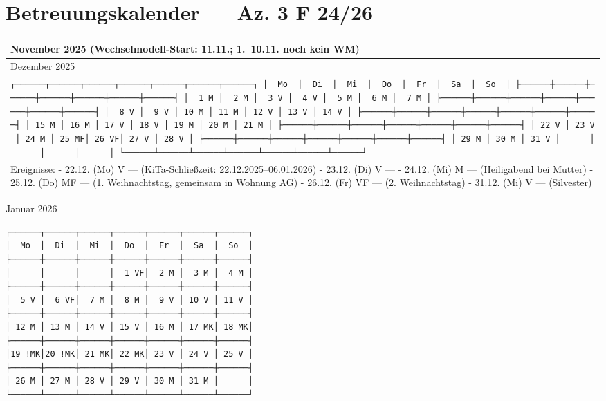 \section{Betreuungskalender --- Az. 3 F
24/26}\label{betreuungskalender-az.-3-f-2426}

{\def\LTcaptype{none} %
\begin{longtable}[]{@{}
  >{\raggedright\arraybackslash}p{}@{}}
\toprule\noalign{}
\begin{minipage}[b]{\linewidth}\raggedright
November 2025 (Wechselmodell-Start: 11.11.; 1.--10.11. noch kein WM)
\end{minipage} \\
\midrule\noalign{}
\endhead
\bottomrule\noalign{}
\endlastfoot
Dezember 2025 \\
\texttt{┌──────┬──────┬──────┬──────┬──────┬──────┬──────┐\ │\ \ Mo\ \ │\ \ Di\ \ │\ \ Mi\ \ │\ \ Do\ \ │\ \ Fr\ \ │\ \ Sa\ \ │\ \ So\ \ │\ ├──────┼──────┼──────┼──────┼──────┼──────┼──────┤\ │\ \ 1\ M\ │\ \ 2\ M\ │\ \ 3\ V\ │\ \ 4\ V\ │\ \ 5\ M\ │\ \ 6\ M\ │\ \ 7\ M\ │\ ├──────┼──────┼──────┼──────┼──────┼──────┼──────┤\ │\ \ 8\ V\ │\ \ 9\ V\ │\ 10\ M\ │\ 11\ M\ │\ 12\ V\ │\ 13\ V\ │\ 14\ V\ │\ ├──────┼──────┼──────┼──────┼──────┼──────┼──────┤\ │\ 15\ M\ │\ 16\ M\ │\ 17\ V\ │\ 18\ V\ │\ 19\ M\ │\ 20\ M\ │\ 21\ M\ │\ ├──────┼──────┼──────┼──────┼──────┼──────┼──────┤\ │\ 22\ V\ │\ 23\ V\ │\ 24\ M\ │\ 25\ MF│\ 26\ VF│\ 27\ V\ │\ 28\ V\ │\ ├──────┼──────┼──────┼──────┼──────┼──────┼──────┤\ │\ 29\ M\ │\ 30\ M\ │\ 31\ V\ │\ \ \ \ \ \ │\ \ \ \ \ \ │\ \ \ \ \ \ │\ \ \ \ \ \ │\ └──────┴──────┴──────┴──────┴──────┴──────┴──────┘} \\
Ereignisse: - 22.12. (Mo) V --- (KiTa-Schließzeit:
22.12.2025--06.01.2026) - 23.12. (Di) V --- - 24.12. (Mi) M ---
(Heiligabend bei Mutter) - 25.12. (Do) MF --- (1. Weihnachtstag,
gemeinsam in Wohnung AG) - 26.12. (Fr) VF --- (2. Weihnachtstag) -
31.12. (Mi) V --- (Silvester) \\
\end{longtable}
}

Januar 2026

\begin{verbatim}
┌──────┬──────┬──────┬──────┬──────┬──────┬──────┐
│  Mo  │  Di  │  Mi  │  Do  │  Fr  │  Sa  │  So  │
├──────┼──────┼──────┼──────┼──────┼──────┼──────┤
│      │      │      │  1 VF│  2 M │  3 M │  4 M │
├──────┼──────┼──────┼──────┼──────┼──────┼──────┤
│  5 V │  6 VF│  7 M │  8 M │  9 V │ 10 V │ 11 V │
├──────┼──────┼──────┼──────┼──────┼──────┼──────┤
│ 12 M │ 13 M │ 14 V │ 15 V │ 16 M │ 17 MK│ 18 MK│
├──────┼──────┼──────┼──────┼──────┼──────┼──────┤
│19 !MK│20 !MK│ 21 MK│ 22 MK│ 23 V │ 24 V │ 25 V │
├──────┼──────┼──────┼──────┼──────┼──────┼──────┤
│ 26 M │ 27 M │ 28 V │ 29 V │ 30 M │ 31 M │      │
└──────┴──────┴──────┴──────┴──────┴──────┴──────┘
\end{verbatim}


